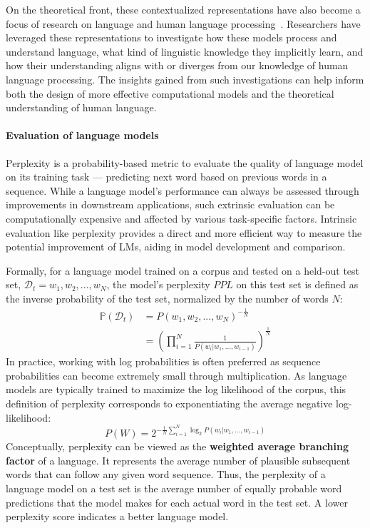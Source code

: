 On the theoretical front, these contextualized representations have also become a focus of research on language and human language processing~. Researchers have leveraged these representations to investigate how these models process and understand language, what kind of linguistic knowledge they implicitly learn, and how their understanding aligns with or diverges from our knowledge of human language processing. The insights gained from such investigations can help inform both the design of more effective computational models and the theoretical understanding of human language.


\paragraph{Evaluation of language models} Perplexity is a probability-based metric to evaluate the quality of language model on its training task --- predicting next word based on previous words in a sequence. While a language model's performance can always be assessed through improvements in downstream applications, such extrinsic evaluation can be computationally expensive and affected by various task-specific factors. Intrinsic evaluation like perplexity provides a direct and more efficient way to measure the potential improvement of LMs, aiding in model development and comparison.

Formally, for a language model trained on a corpus and tested on a held-out test set, $\mathcal{D}_{t} = w_1, w_2, ..., w_N$, the model's perplexity $PPL$ on this test set is defined as the inverse probability of the test set, normalized by the number of words $N$:
\begin{align}
\mathbb{P}(\mathcal{D}_{t}) &= P(w_1, w_2, ..., w_N)^{-\frac{1}{N}} \nonumber \\
&= \left(\prod_{i=1}^{N} \frac{1}{P(w_i | w_1, \ldots, w_{i-1})}\right)^{\frac{1}{N}}
\end{align}
In practice, working with log probabilities is often preferred as sequence probabilities can become extremely small through multiplication. As language models are typically trained to maximize the log likelihood of the corpus, this definition of perplexity corresponds to exponentiating the average negative log-likelihood:
\begin{equation}
P(W) = 2^{-\frac{1}{N} \sum_{i=1}^{N} \log_2 P(w_i | w_1, \ldots, w_{i-1})}
\end{equation}
Conceptually, perplexity can be viewed as the \textbf{weighted average branching factor} of a language. It represents the average number of plausible
subsequent words that can follow any given word sequence. Thus, the perplexity of a language model on a test set is the average number of equally probable word predictions that the model makes for each actual word in the test set. A lower perplexity score indicates a better language model.  

